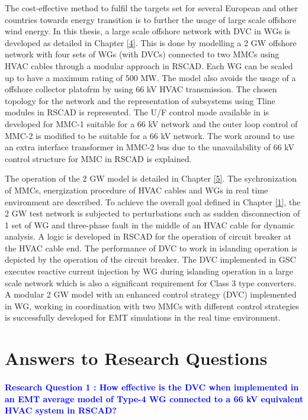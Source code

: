 The cost-effective method to fulfil the targets set for several European and other countries towards energy transition is to further the usage of large scale offshore wind energy. In this thesis, a large scale offshore network with \gls{DVC} in \gls{WG}s is developed as detailed in Chapter \ref{4}. This is done by modelling a 2 GW offshore network with four sets of \gls{WG}s (with \gls{DVC}s) connected to two \gls{MMC}s using \gls{HVAC} cables through a modular approach in RSCAD. Each \gls{WG} can be scaled up to have a maximum rating of 500 MW. The model also avoids the usage of a offshore collector platofrm by using 66 kV \gls{HVAC} transmission. The chosen topology for the network and the representation of subsystems using Tline modules in RSCAD is represented. The U/F control mode available in \cite{wachal2014guide} is developed for \gls{MMC}-1 suitable for a 66 kV network and the outer loop control of \gls{MMC}-2 is modified to be suitable for a 66 kV network. The work around to use an extra interface transformer in \gls{MMC}-2 bus due to the unavailability of 66 kV control structure for \gls{MMC} in RSCAD is explained. 


The operation of the 2 GW model is detailed in Chapter \ref{5}. The sychronization of \gls{MMC}s, energization procedure of \gls{HVAC} cables and \gls{WG}s in real time environment are described. To achieve the overall goal defined in Chapter \ref{1}, the 2 GW test network is subjected to perturbations such as sudden disconnection of 1 set of \gls{WG} and three-phase fault in the middle of an \gls{HVAC} cable for dynamic analysis. A logic is developed in RSCAD for the operation of circuit breaker at the \gls{HVAC} cable end. The performance of \gls{DVC} to work in islanding operation is depicted by the operation of the circuit breaker. The \gls{DVC} implemented in \gls{GSC} executes reactive current injection by \gls{WG} during islanding operation in a large scale network which is also a significant requirement for Class 3 type converters. A modular 2 GW model with an enhanced control strategy (\gls{DVC}) implemented in \gls{WG}, working in coordination with two \gls{MMC}s with different control strategies is successfully developed for \gls{EMT} simulations in the real time environment.   


\section{Answers to Research Questions}
\vspace{2mm}
\paragraph{\textcolor{blue}{Research Question 1 : How effective is the \gls{DVC} when implemented in an \gls{EMT} average model of Type-4 \gls{WG} connected to a 66 kV equivalent \gls{HVAC} system in RSCAD?}}

